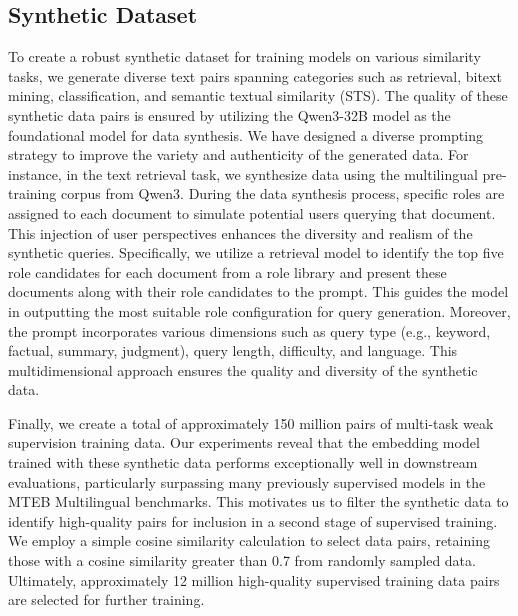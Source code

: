 \subsection{Synthetic Dataset}
To create a robust synthetic dataset for training models on various similarity tasks, we generate diverse text pairs spanning categories such as retrieval, bitext mining, classification, and semantic textual similarity (STS). The quality of these synthetic data pairs is ensured by utilizing the Qwen3-32B model as the foundational model for data synthesis. We have designed a diverse prompting strategy to improve the variety and authenticity of the generated data. For instance, in the text retrieval task, we synthesize data using the multilingual pre-training corpus from Qwen3. During the data synthesis process, specific roles are assigned to each document to simulate potential users querying that document. This injection of user perspectives enhances the diversity and realism of the synthetic queries. Specifically, we utilize a retrieval model to identify the top five role candidates for each document from a role library and present these documents along with their role candidates to the prompt. This guides the model in outputting the most suitable role configuration for query generation. Moreover, the prompt incorporates various dimensions such as query type (e.g., keyword, factual, summary, judgment), query length, difficulty, and language. This multidimensional approach ensures the quality and diversity of the synthetic data.

Finally, we create a total of approximately 150 million pairs of multi-task weak supervision training data. Our experiments reveal that the embedding model trained with these synthetic data performs exceptionally well in downstream evaluations, particularly surpassing many previously supervised models in the MTEB Multilingual benchmarks. This motivates us to filter the synthetic data to identify high-quality pairs for inclusion in a second stage of supervised training. We employ a simple cosine similarity calculation to select data pairs, retaining those with a cosine similarity greater than 0.7 from randomly sampled data. Ultimately, approximately 12 million high-quality supervised training data pairs are selected for further training.
